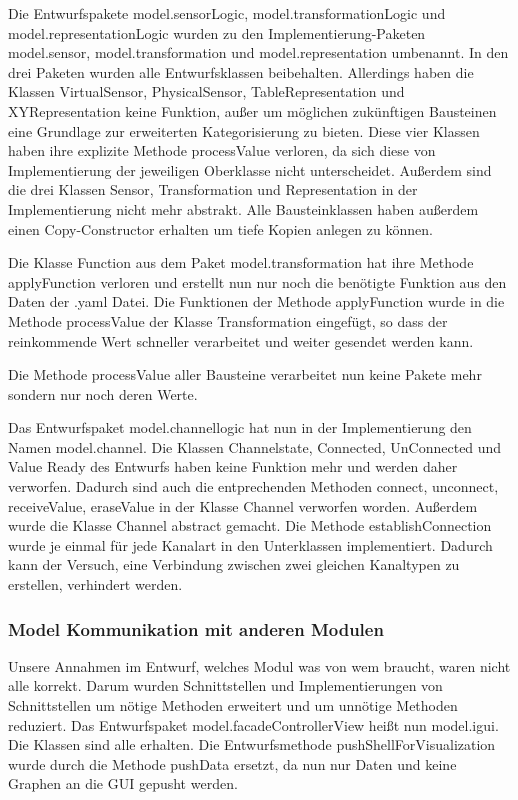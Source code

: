 \documentclass[parskip=full]{scrartcl}
\begin{document}
Die Entwurfspakete model.sensorLogic, model.transformationLogic und model.representationLogic wurden zu den Implementierung-Paketen model.sensor, model.transformation und model.representation umbenannt. In den drei Paketen wurden alle Entwurfsklassen beibehalten. Allerdings haben die Klassen VirtualSensor, PhysicalSensor, TableRepresentation und XYRepresentation keine Funktion, außer um möglichen zukünftigen Bausteinen eine Grundlage zur erweiterten Kategorisierung zu bieten. Diese vier Klassen haben ihre explizite Methode processValue verloren, da sich diese von Implementierung der jeweiligen Oberklasse nicht unterscheidet. Außerdem sind die drei Klassen Sensor, Transformation und Representation in der Implementierung nicht mehr abstrakt. Alle Bausteinklassen haben außerdem einen Copy-Constructor erhalten um tiefe Kopien anlegen zu können.

Die Klasse Function aus dem Paket model.transformation hat ihre Methode applyFunction verloren und erstellt nun nur noch die benötigte Funktion aus den Daten der .yaml Datei. Die Funktionen der Methode applyFunction wurde in die Methode processValue der Klasse Transformation eingefügt, so dass der reinkommende Wert schneller verarbeitet und weiter gesendet werden kann.

Die Methode processValue aller Bausteine verarbeitet nun keine Pakete mehr sondern nur noch deren Werte.

Das Entwurfspaket model.channellogic hat nun in der Implementierung den Namen model.channel. Die Klassen Channelstate, Connected, UnConnected und Value Ready des Entwurfs haben keine Funktion mehr und werden daher verworfen. Dadurch sind auch die entprechenden Methoden connect, unconnect, receiveValue, eraseValue in der Klasse Channel verworfen worden. Außerdem wurde die Klasse Channel abstract gemacht. Die Methode establishConnection wurde je einmal für jede Kanalart in den Unterklassen implementiert. Dadurch kann der Versuch, eine Verbindung zwischen zwei gleichen Kanaltypen zu erstellen, verhindert werden. 


\subsubsection{Model Kommunikation mit anderen Modulen}
Unsere Annahmen im Entwurf, welches Modul was von wem braucht, waren nicht alle korrekt. Darum wurden Schnittstellen und Implementierungen von Schnittstellen um nötige Methoden erweitert und um unnötige Methoden reduziert.
Das Entwurfspaket model.facadeControllerView heißt nun model.igui. Die Klassen sind alle erhalten. Die Entwurfsmethode pushShellForVisualization wurde durch die Methode pushData ersetzt, da nun nur Daten und keine Graphen an die GUI gepusht werden.
\end{document}
